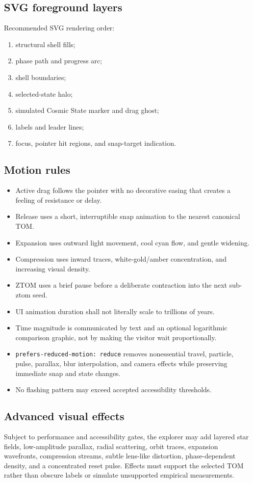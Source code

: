 \documentclass[11pt,letterpaper]{article}
\begin{document}
\subsection{SVG foreground layers}
Recommended SVG rendering order:
\begin{enumerate}
\item structural shell fills;
\item phase path and progress arc;
\item shell boundaries;
\item selected-state halo;
\item simulated Cosmic State marker and drag ghost;
\item labels and leader lines;
\item focus, pointer hit regions, and snap-target indication.
\end{enumerate}

\subsection{Motion rules}
\begin{itemize}
\item Active drag follows the pointer with no decorative easing that creates a feeling of resistance or delay.
\item Release uses a short, interruptible snap animation to the nearest canonical TOM.
\item Expansion uses outward light movement, cool cyan flow, and gentle widening.
\item Compression uses inward traces, white-gold/amber concentration, and increasing visual density.
\item ZTOM uses a brief pause before a deliberate contraction into the next sub-ztom seed.
\item UI animation duration shall not literally scale to trillions of years.
\item Time magnitude is communicated by text and an optional logarithmic comparison graphic, not by making the visitor wait proportionally.
\item \texttt{prefers-reduced-motion: reduce} removes nonessential travel, particle, pulse, parallax, blur interpolation, and camera effects while preserving immediate snap and state changes.
\item No flashing pattern may exceed accepted accessibility thresholds.
\end{itemize}

\subsection{Advanced visual effects}
Subject to performance and accessibility gates, the explorer may add layered star fields, low-amplitude parallax, radial scattering, orbit traces, expansion wavefronts, compression streams, subtle lens-like distortion, phase-dependent density, and a concentrated reset pulse. Effects must support the selected TOM rather than obscure labels or simulate unsupported empirical measurements.
\end{document}
